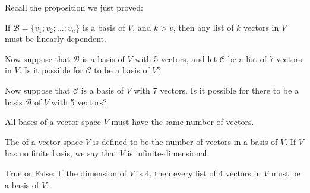 \endedxtext


\endedxvertical








Recall the proposition we just proved: 

{}  If $\mathcal{B}  = \{v_1; v_2; \ldots ; v_n\}$ is a basis of $V$, and $k>v$, then any list
of $k$ vectors in $V$ must be linearly dependent.  

Now suppose that $\mathcal{B}$ is a basis of $V$ with 5 vectors, and let $\mathcal{C}$ be a list of 7 vectors
in $V$.  Is it possible for $\mathcal{C}$ to be a basis of $V$?  



\edXsolution{
}

\endedxproblem



Now suppose that  $\mathcal{C}$ is a basis of $V$ with 7 vectors.  Is it possible for there to be a basis $\mathcal{B}$ of $V$ with 5 vectors?  



\edXsolution{
}

\endedxproblem

\endedxvertical









{}  All bases of a vector space $V$ must have the same number of vectors.  
  

{}  
The {} of a vector space $V$ is defined to be the number of vectors in 
a basis of $V$.  If $V$ has no finite basis, we say that $V$ is infinite-dimensional.  


\endedxtext



True or False: If the dimension of $V$ is 4, then every list of 4 vectors in $V$ must be a basis of $V$.  


